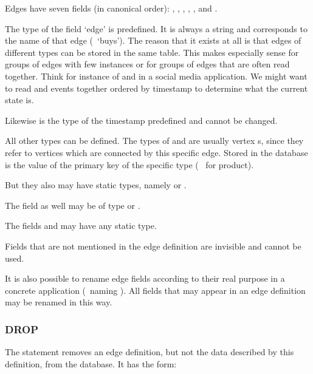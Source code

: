 Edges have seven fields (in canonical order):
,
, ,
, ,
 and .

The type of the field `edge' is predefined.
It is always a string and corresponds to the
name of that edge (\eg\ `buys').
The reason that it exists at all
is that edges of different types can be stored
in the same table.
This makes especially sense for groups of edges
with few instances or for groups of edges
that are often read together.
Think for instance of  and 
in a social media application.
We might want to read  and 
events together ordered by timestamp to determine
what the current state is.

Likewise is the type of the timestamp predefined
and cannot be changed.

All other types can be defined.
The types of  and 
are usually vertex s, since they refer
to vertices which are connected by this specific edge.
Stored in the database is the value of the primary key
of the specific type (\ie\  for product).

But they also may have static types, namely
 or .

The field  as well may be of type
 or .

The fields  and 
may have any static type.

Fields that are not mentioned in the edge definition
are invisible and cannot be used.


It is also possible to rename edge fields
according to their real purpose in a concrete
application (\eg\ naming  ).
All fields that may appear in an edge definition
may be renamed in this way.

\subsubsection{DROP}
The  statement removes an edge definition,
but not the data described by this definition,
from the database.
It has the form:


